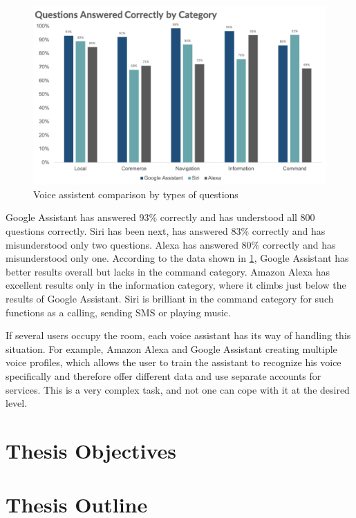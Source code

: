 \begin{figure}[H]
    \centering
    \includegraphics[width=\textwidth]{img/voice_assistent_comparison.png}
    \caption{Voice assistent comparison by types of questions}
    \label{fig:voice_assistant_comparison}
\end{figure}

Google Assistant has answered 93\% correctly and has understood all 800 questions correctly. Siri has been next, has answered 83\% correctly and has misunderstood only two questions. Alexa has answered 80\% correctly and has misunderstood only one. According to the data shown in \cref{fig:voice_assistant_comparison}, Google Assistant has better results overall but lacks in the command category. Amazon Alexa has excellent results only in the information category, where it climbs just below the results of Google Assistant. Siri is brilliant in the command category for such functions as a calling, sending SMS or playing music.

If several users occupy the room, each voice assistant has its way of handling this situation. For example, Amazon Alexa and Google Assistant creating multiple voice profiles, which allows the user to train the assistant to recognize his voice specifically and therefore offer different data and use separate accounts for services. This is a very complex task, and not one can cope with it at the desired level.





\section{Thesis Objectives} \label{sec:thesis_objectives}

\section{Thesis Outline} \label{sec:thesis_outline}
